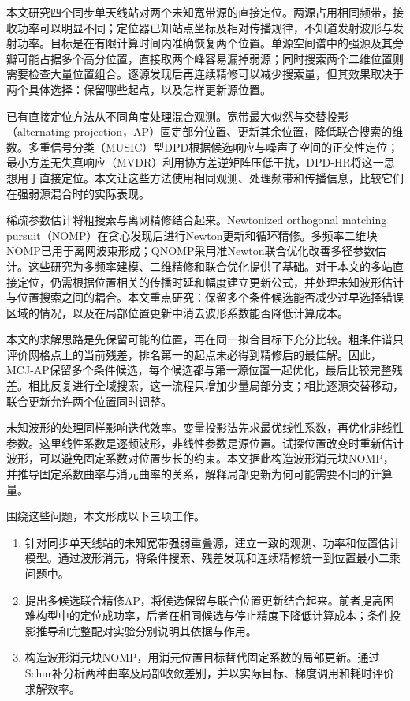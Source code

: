 \documentclass[a4paper,fleqn]{cas-sc}
\numberwithin{equation}{section}
\numberwithin{figure}{section}
\numberwithin{table}{section}
\begin{document}
本文研究四个同步单天线站对两个未知宽带源的直接定位。两源占用相同频带，接收功率可以明显不同；定位器已知站点坐标及相对传播规律，不知道发射波形与发射功率。目标是在有限计算时间内准确恢复两个位置。单源空间谱中的强源及其旁瓣可能占据多个高分位置，直接取两个峰容易漏掉弱源；同时搜索两个二维位置则需要检查大量位置组合。逐源发现后再连续精修可以减少搜索量，但其效果取决于两个具体选择：保留哪些起点，以及怎样更新源位置。

已有直接定位方法从不同角度处理混合观测。宽带最大似然与交替投影（alternating projection，AP）固定部分位置、更新其余位置，降低联合搜索的维数\cite{ChenHudsonYao2002}。多重信号分类（MUSIC）型DPD根据候选响应与噪声子空间的正交性定位\cite{WeissAmar2005}；最小方差无失真响应（MVDR）利用协方差逆矩阵压低干扰\cite{Capon1969}，DPD-HR将这一思想用于直接定位\cite{TirerWeiss2016}。本文让这些方法使用相同观测、处理频带和传播信息，比较它们在强弱源混合时的实际表现。

稀疏参数估计将粗搜索与离网精修结合起来。Newtonized orthogonal matching pursuit（NOMP）在贪心发现后进行Newton更新和循环精修\cite{Mamandipoor2016}。多频率二维块NOMP已用于离网波束形成\cite{Yang2022}；QNOMP采用准Newton联合优化改善多径参数估计\cite{Zeng2025}。这些研究为多频率建模、二维精修和联合优化提供了基础。对于本文的多站直接定位，仍需根据位置相关的传播时延和幅度建立更新公式，并处理未知波形估计与位置搜索之间的耦合。本文重点研究：保留多个条件候选能否减少过早选择错误区域的情况，以及在局部位置更新中消去波形系数能否降低计算成本。

本文的求解思路是先保留可能的位置，再在同一拟合目标下充分比较。粗条件谱只评价网格点上的当前残差，排名第一的起点未必得到精修后的最佳解。因此，MCJ-AP保留多个条件候选，每个候选都与第一源位置一起优化，最后比较完整残差。相比反复进行全域搜索，这一流程只增加少量局部分支；相比逐源交替移动，联合更新允许两个位置同时调整。

未知波形的处理同样影响迭代效率。变量投影法先求最优线性系数，再优化非线性参数\cite{GolubPereyra1973}。这里线性系数是逐频波形，非线性参数是源位置。试探位置改变时重新估计波形，可以避免固定系数对位置步长的约束。本文据此构造波形消元块NOMP，并推导固定系数曲率与消元曲率的关系，解释局部更新为何可能需要不同的计算量。

围绕这些问题，本文形成以下三项工作。
\begin{enumerate}
  \item 针对同步单天线站的未知宽带强弱重叠源，建立一致的观测、功率和位置估计模型。通过波形消元，将条件搜索、残差发现和连续精修统一到位置最小二乘问题中。
  \item 提出多候选联合精修AP，将候选保留与联合位置更新结合起来。前者提高困难构型中的定位成功率，后者在相同候选与停止精度下降低计算成本；条件投影推导和完整配对实验分别说明其依据与作用。
  \item 构造波形消元块NOMP，用消元位置目标替代固定系数的局部更新。通过Schur补分析两种曲率及局部收敛差别，并以实际目标、梯度调用和耗时评价求解效率。
\end{enumerate}
\end{document}
